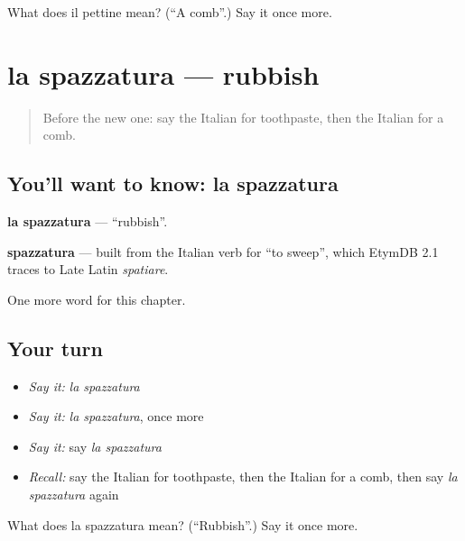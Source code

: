 \begin{tcolorbox}[breakable,colback=teal!4,colframe=teal!35!black,title={Before you move on}]
What does il pettine mean? (\textquotedblleft{}A comb\textquotedblright{}.) Say it once more.
\end{tcolorbox}
\section[la spazzatura]{la spazzatura — rubbish}

\label{lesson:IT-C97-spazzatura}



\begin{quote}
Before the new one: say the Italian for toothpaste, then the Italian for a comb.
\end{quote}

\subsection*{You'll want to know: la spazzatura}
\textbf{la spazzatura} — \textquotedblleft{}rubbish\textquotedblright{}.

\begin{cousinweb}
\textbf{spazzatura} — built from the Italian verb for \textquotedblleft{}to sweep\textquotedblright{}, which EtymDB 2.1 traces to Late Latin \emph{spatiare}.
\end{cousinweb}

\begin{grammarlens}[title={What you've built}]
One more word for this chapter.
\end{grammarlens}

\subsection*{Your turn}
\begin{itemize}
\raggedright
  \item \emph{Say it:} \emph{la spazzatura}
  \item \emph{Say it:} \emph{la spazzatura}, once more
  \item \emph{Say it:} say \emph{la spazzatura}
  \item \emph{Recall:} say the Italian for toothpaste, then the Italian for a comb, then say \emph{la spazzatura} again
\end{itemize}

\begin{tcolorbox}[breakable,colback=teal!4,colframe=teal!35!black,title={Before you move on}]
What does la spazzatura mean? (\textquotedblleft{}Rubbish\textquotedblright{}.) Say it once more.
\end{tcolorbox}
